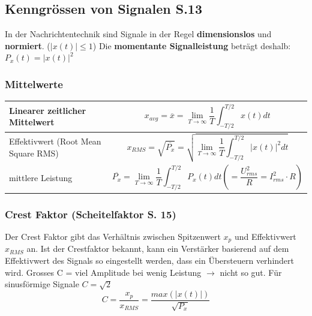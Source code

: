 \subsection{Kenngrössen von Signalen S.13}
In der Nachrichtentechnik sind Signale in der Regel \textbf{dimensionslos} und \textbf{normiert}. ($|x(t)| \leq 1$) Die \textbf{momentante Signalleistung} beträgt deshalb: $P_x(t) = |x(t)|^2$
\subsubsection{Mittelwerte}\vspace{-1em}

\begin{table}[H]
	\renewcommand{\arraystretch}{2.2}
	\begin{tabularx}{\textwidth}{X X}
		Linearer zeitlicher Mittelwert
		&
		\begin{minipage}{\linewidth}
		\begin{equation*} x_{avg}=\overline{x}=\lim\limits_{T\rightarrow\infty} \frac{1}{T} \int_{-T/2}^{T/2}x(t)dt \end{equation*}
		\end{minipage}
		\\ \hline 
		Effektivwert (Root Mean Square RMS)
		&
		\begin{minipage}{\linewidth}
		\begin{equation*} x_{RMS}=\sqrt{\overline{P_x}}=\sqrt{\lim\limits_{T\rightarrow\infty} \frac{1}{T} \int_{-T/2}^{T/2}|x(t)|^2 dt} \end{equation*}
		\end{minipage}
		\\ \hline 
		mittlere Leistung
		&
		\begin{minipage}{\linewidth}
			\begin{equation*} \overline{P_x} = \lim\limits_{T\rightarrow\infty} \frac{1}{T}\int_{-T/2}^{T/2} P_x(t)dt \left(= \frac{U_{rms}^2}{R} = I_{rms}^2 \cdot R\right)\end{equation*}
		\end{minipage}
	\end{tabularx}
\end{table}

\subsubsection{Crest Faktor (Scheitelfaktor S. 15)}
Der Crest Faktor gibt das Verhältnis zwischen Spitzenwert $x_p$ und Effektivwert $x_{RMS}$ an. Ist der Crestfaktor bekannt, kann ein Verstärker basierend auf dem Effektivwert des Signals so eingestellt werden, dass ein Übersteuern verhindert wird. Grosses C = viel Amplitude bei wenig Leistung $\rightarrow$ nicht so gut. Für sinusförmige Signale $C = \sqrt{2}$
\begin{equation*}
	C = \frac{x_p}{x_{RMS}} = \frac{max(|x(t)|)}{\sqrt{P_x}}
\end{equation*}


